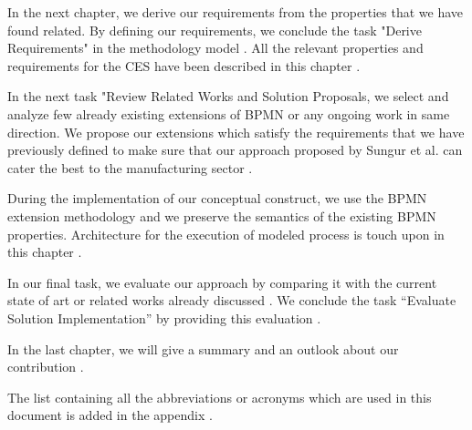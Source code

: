 In the next chapter, we derive our requirements from the properties that we have found related. By defining our requirements, we conclude the task "Derive Requirements" in the methodology model . All the relevant properties and requirements for the \acs{CES} have been described in this chapter .

In the next task "Review Related Works and Solution Proposals, we select and analyze few already existing extensions of \acs{BPMN} or any ongoing work in same direction. We propose our extensions which satisfy the requirements that we have previously defined to make sure that our approach proposed by Sungur et al. \cite{TIMURCIRP} can cater the best to the manufacturing sector . 

During the implementation of our conceptual construct, we use the \acs{BPMN} extension methodology and we preserve the semantics of the existing \acs{BPMN} properties. Architecture for the execution of modeled process is touch upon in this chapter .

In our final task, we evaluate our approach by comparing it with the current state of art or related works already discussed . We conclude the task “Evaluate Solution Implementation” by providing this evaluation . 

In the last chapter, we will give a summary and an outlook about our contribution . 

The list containing all the abbreviations or acronyms which are used in this document is added in the appendix .